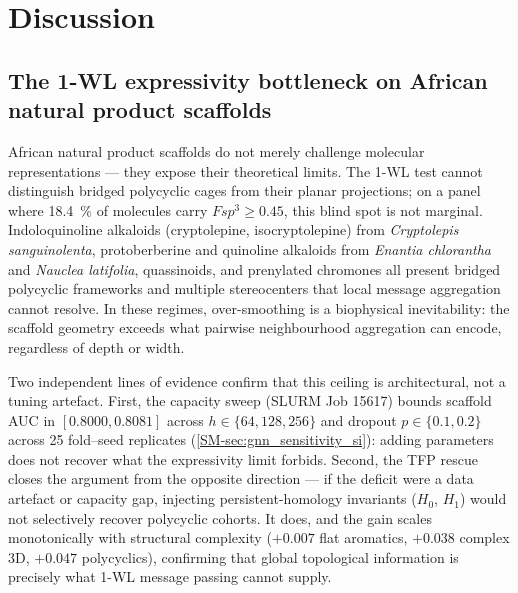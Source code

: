 
\section{Discussion}

\subsection{The 1-WL expressivity bottleneck on African natural product scaffolds}

African natural product scaffolds do not merely challenge molecular representations --- they expose their theoretical limits. The 1-WL test cannot distinguish bridged polycyclic cages from their planar projections; on a panel where \qty{18.4}{\percent} of molecules carry $Fsp^3 \ge 0.45$, this blind spot is not marginal. Indoloquinoline alkaloids (cryptolepine, isocryptolepine) from \emph{Cryptolepis sanguinolenta}, protoberberine and quinoline alkaloids from \emph{Enantia chlorantha} and \emph{Nauclea latifolia}, quassinoids, and prenylated chromones all present bridged polycyclic frameworks and multiple stereocenters that local message aggregation cannot resolve. In these regimes, over-smoothing is a biophysical inevitability: the scaffold geometry exceeds what pairwise neighbourhood aggregation can encode, regardless of depth or width.

Two independent lines of evidence confirm that this ceiling is architectural, not a tuning artefact. First, the capacity sweep (SLURM Job 15617) bounds scaffold AUC in $[0.8000, 0.8081]$ across $h \in \{64, 128, 256\}$ and dropout $p \in \{0.1, 0.2\}$ across \num{25} fold--seed replicates (\cref{SM-sec:gnn_sensitivity_si}): adding parameters does not recover what the expressivity limit forbids. Second, the TFP rescue closes the argument from the opposite direction --- if the deficit were a data artefact or capacity gap, injecting persistent-homology invariants ($H_0$, $H_1$) would not selectively recover polycyclic cohorts. It does, and the gain scales monotonically with structural complexity ($+\num{0.007}$ flat aromatics, $+\num{0.038}$ complex 3D, $+\num{0.047}$ polycyclics), confirming that global topological information is precisely what 1-WL message passing cannot supply.

